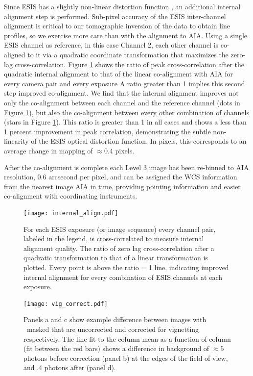 Since ESIS has a slightly non-linear distortion function \citep{ESIS}, an additional internal alignment step is performed. 
Sub-pixel accuracy of the ESIS inter-channel alignment is critical to our tomographic inversion of the data to obtain line profiles, so we exercise more care than with the alignment to AIA.
Using a single ESIS channel as reference, in this case Channel 2, each other channel is co-aligned to it via a quadratic coordinate transformation that maximizes the zero-lag cross-correlation. 
Figure \ref{fig:cc} shows the ratio of peak cross-correlation after the quadratic internal alignment to that of the linear co-alignment with AIA for every camera pair and every exposure
A ratio greater than 1 implies this second step improved co-alignment.
We find that the internal alignment improves not only the co-alignment between each channel and the reference channel (dots in Figure \ref{fig:cc}), but also the co-alignment between every other combination of channels (stars in Figure \ref{fig:cc}).
This ratio is greater than 1 in all cases and shows a less than 1 percent improvement in peak correlation, demonstrating the subtle non-linearity of the ESIS optical distortion function.
In pixels, this corresponds to an average change in mapping of $\approx 0.4$ pixels.

After the co-alignment is complete each Level 3 image has been re-binned to AIA resolution, 0.6 arcsecond per pixel, and can be assigned the WCS information \citep{WCS} from the nearest image AIA in time, providing pointing information and easier co-alignment with coordinating instruments.



 \begin{figure}[htb!]
	\centering
	\texttt{[image: internal\_align.pdf]}
	\caption{For each ESIS exposure (or image sequence) every channel pair, labeled in the legend, is cross-correlated to measure internal alignment quality.  The ratio of zero lag cross-correlation after a quadratic transformation to that of a linear transformation is plotted.  Every point is above the ratio = 1 line, indicating improved internal alignment for every combination of ESIS channels at each exposure.}
	\label{fig:cc}	
\end{figure}

 \begin{figure}[htb!]
	\centering
	\texttt{[image: vig\_correct.pdf]}
	\caption{Panels a and c show example difference between images with \mgxbright \ masked that are uncorrected and corrected for vignetting respectively.  The line fit to the column mean as a function of column (fit between the red bars) shows a difference in background of $\approx 5$ photons before correction (panel b) at the edges of the field of view, and .4 photons after (panel d). }
	\label{fig:vig_correct}
\end{figure}

